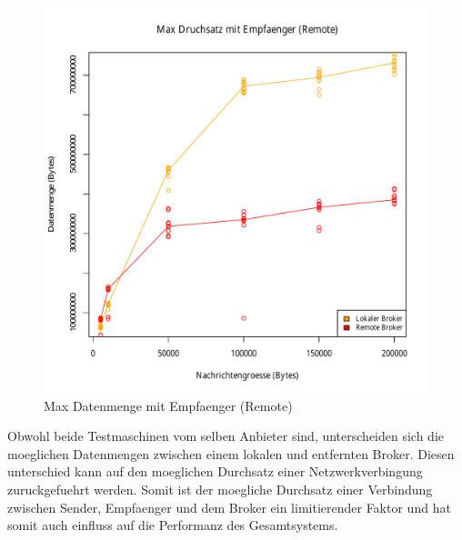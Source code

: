 \begin{figure}
\center
 \includegraphics[width=1\textwidth]{images/measurement/rate-limit-unlimited-AvsB.pdf}
  \caption{Max Datenmenge mit Empfaenger (Remote)}
  \label{img:maxByteThroughputB}
\end{figure}
Obwohl beide Testmaschinen vom selben Anbieter sind, unterscheiden sich die moeglichen Datenmengen zwischen einem lokalen und entfernten Broker. Diesen unterschied kann auf den moeglichen Durchsatz einer Netzwerkverbingung zuruckgefuehrt werden. Somit ist der moegliche Durchsatz einer Verbindung zwischen Sender, Empfaenger und dem Broker ein limitierender Faktor und hat somit auch einfluss auf die Performanz des Gesamtsystems.


